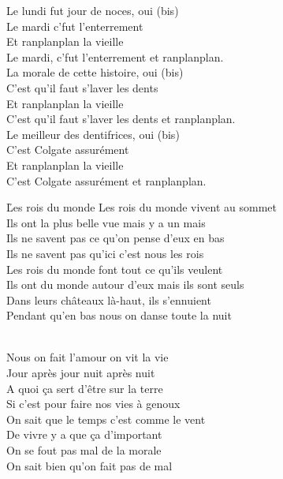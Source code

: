 \documentclass{novel}
\begin{document}
{\begin{minipage}[t][0.55\textheight][t]{\textwidth}
\begin{multicols}{2}
Le lundi fut jour de noces, oui (bis) \\
Le mardi c'fut l'enterrement \\
Et ranplanplan la vieille \\
Le mardi, c'fut l'enterrement et ranplanplan. \\

La morale de cette histoire, oui (bis) \\
C’est qu’il faut s’laver les dents \\
Et ranplanplan la vieille \\
C’est qu’il faut s’laver les dents et ranplanplan. \\

Le meilleur des dentifrices, oui (bis) \\
C’est Colgate assurément \\
Et ranplanplan la vieille \\
C’est Colgate assurément et ranplanplan.

\end{multicols}
\end{minipage}
}

\newpage
\normalsize
\h*{Les rois du monde}
Les rois du monde vivent au sommet \\
Ils ont la plus belle vue mais y a un mais \\
Ils ne savent pas ce qu'on pense d'eux en bas \\
Ils ne savent pas qu'ici c'est nous les rois \\
Les rois du monde font tout ce qu'ils veulent \\
Ils ont du monde autour d'eux mais ils sont seuls \\
Dans leurs châteaux là-haut, ils s'ennuient \\
Pendant qu'en bas nous on danse toute la nuit \\

\begin{bfseries}
[Refrain:]\\
Nous on fait l'amour on vit la vie \\
Jour après jour nuit après nuit \\
A quoi ça sert d'être sur la terre \\
Si c'est pour faire nos vies à genoux \\
On sait que le temps c'est comme le vent \\
De vivre y a que ça d'important \\
On se fout pas mal de la morale \\
On sait bien qu'on fait pas de mal \\
\end{bfseries}
\end{document}
